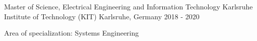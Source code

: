 

\begin{cventries}

   \cventry
    {Master of Science, Electrical Engineering and Information Technology}
    {Karlsruhe Institute of Technology (KIT)}
    {Karlsruhe, Germany}
    {2018 - 2020}
    {
      \begin{cvitems} %
        \item {Area of specialization: Systems Engineering}
      \end{cvitems}
    }

\end{cventries}
